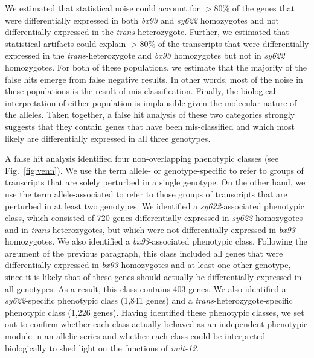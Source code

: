 \documentclass[10pt, twocolumn]{article}
\newcommand{\gene}[1]{\mbox{\emph{#1}}}
\newcommand{\dpy}{\gene{mdt-12}}
\begin{document}
We estimated that statistical noise could account for $>80$\%
of the genes that were differentially expressed in both \emph{bx93} and
\emph{sy622} homozygotes and not differentially expressed in the
\emph{trans}-heterozygote. Further, we estimated that statistical artifacts
could explain $>80$\% of the transcripts that were differentially
expressed in the \emph{trans}-heterozygote and \emph{bx93} homozygotes but not
in \emph{sy622} homozygotes. For both of these populations, we estimate that
the majority of the false hits emerge from false negative results. In other words,
most of the noise in these populations is the result of mis-classification.
Finally, the biological interpretation of either population is implausible given
the molecular nature of the alleles. Taken together, a false hit analysis of
these two categories strongly suggests that they contain genes that have been
mis-classified and which most likely are differentially expressed in all three
genotypes.

A false hit analysis identified four non-overlapping phenotypic classes (see
Fig.~\ref{fig:venn}). We use the term allele- or genotype-specific to refer to
groups of transcripts that are solely perturbed in a single genotype. On the
other hand, we use the term allele-associated to refer to those groups of
transcripts that are perturbed in at least two genotypes. We identified a
\emph{sy622}-associated phenotypic class, which consisted of 720 genes
differentially expressed in \emph{sy622} homozygotes and in
\emph{trans}-heterozygotes, but which were not differentially expressed in
\emph{bx93} homozygotes. We also identified a \emph{bx93}-associated phenotypic
class. Following the argument of the previous paragraph, this class included all
genes that were differentially expressed in \emph{bx93} homozygotes and at least
one other genotype, since it is likely that of these genes should actually be
differentially expressed in all genotypes. As a result, this class contains 403
genes. We also identified a \emph{sy622}-specific phenotypic class (1,841 genes)
and a \emph{trans}-heterozygote-specific phenotypic class (1,226 genes). Having
identified these phenotypic classes, we set out to confirm whether each class
actually behaved as an independent phenotypic module in an allelic series and
whether each class could be interpreted biologically to shed light on the
functions of \dpy{}.
\end{document}
